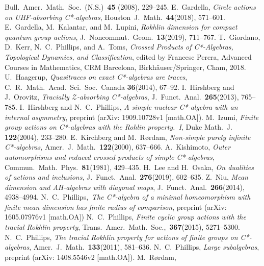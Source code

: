 \documentclass[10pt]{amsart}
\numberwithin{equation}{section}
\theoremstyle{definition}
\begin{document}
\begin{thebibliography}{99}
Bull.\ Amer.\ Math.\  Soc.\ (N.S.)\  {\textbf{45}} (2008), 229--245.
%
E.\ Gardella,  
{\emph{Circle actions on UHF-absorbing C*-algebras}},
Houston\ J.\ Math.\  {\textbf{44}}(2018), 571--601.
%
E.\ Gardella, M.\ Kalantar, and M.\ Lupini, 
{\emph{Rokhlin dimension for compact quantum group actions}},
J.\ Noncommut.\ Geom.\  {\textbf{13}}(2019), 711--767.
%
T.~Giordano, D.~Kerr, N.~C.~Phillips, and A.~Toms,
{\emph{Crossed Products of C*-Algebras,
 Topological Dynamics, and Classification}},
edited by Francesc Perera,
Advanced Courses in Mathematics, CRM Barcelona,
Birkh\"{a}user/Springer, Cham, 2018.
%
U.~Haagerup,
{\emph{Quasitraces on exact C*-algebras are traces}},
C.~R.\  Math.\  Acad.\  Sci.\  Soc.\   Canada {\textbf{36}}(2014),
67--92.
%
I.~Hirshberg and J.~Orovitz,
{\emph{Tracially ${\mathcal{Z}}$-absorbing C*-algebras}},
J.~Funct.\  Anal.\  {\textbf{265}}(2013), 765--785.
%
I.~Hirshberg and N.~C.\  Phillips,
{\emph{A simple nuclear C*-algebra with an internal asymmetry}},
preprint (arXiv: 1909.10728v1 [math.OA]).
%
%
  M.~Izumi,
 {\emph{Finite group actions on C*-algebras with the
    Rohlin property.~I}},
 Duke Math.\, J.\,  {\textbf{122}}(2004), 233--280.
%
 E.~Kirchberg and M.~R{\o}rdam,
{\emph{Non-simple purely infinite C*-algebras}},
Amer.\  J.\  Math.\  {\textbf{122}}(2000), 637--666.
%
 A.~Kishimoto,
{\emph{Outer automorphisms and reduced crossed products of simple
  C*-algebras}},
Commun.\  Math.\  Phys.\  {\textbf{81}}(1981), 429--435.
 H.\ Lee and H.\ Osaka,
{\emph{On dualities of actions and inclusions}},
J.~Funct.\  Anal.\  {\textbf{276}}(2019), 602--635.
%
Z.~Niu,
{\emph{Mean dimension and AH-algebras with diagonal maps}},
J.~Funct.\  Anal.\  {\textbf{266}}(2014), 4938--4994.
%
 N.~C.\  Phillips,\
{\emph{The C*-algebra of a minimal homeomorphism with finite mean dimension has
finite radius of comparison}},
preprint (arXiv: 1605.07976v1 [math.OA])
%
 N.~C.\,  Phillips,
 {\emph{Finite cyclic group actions with the tracial Rokhlin property}},
 Trans.\ Amer.\  Math.\  Soc.,\  {\textbf{367}}(2015), 5271--5300.
%
 N.~C.\,  Phillips,
 {\emph{The tracial Rokhlin property
      for actions of finite groups on C*-algebras}},
 Amer.\,  J.\,  Math.\,  {\textbf{133}}(2011), 581--636.
%
N.~C.\  Phillips,
{\emph{Large subalgebras}},
preprint (arXiv: 1408.5546v2 [math.OA]).
%
 M.~R{\o}rdam,

\end{thebibliography}
\end{document}
